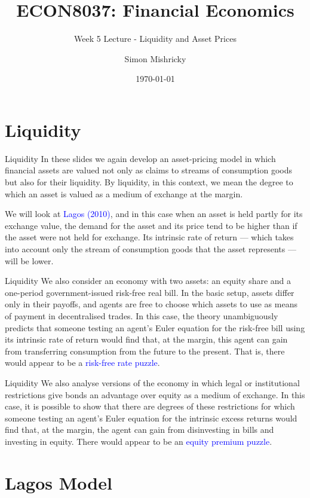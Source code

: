 \documentclass[aspectratio=169,xcolor=dvipsnames]{beamer}
\title{ECON8037: Financial Economics}
\subtitle{\normalsize Week 5 Lecture - Liquidity and Asset Prices}
\author{Simon Mishricky}
\institute{Research School of Economics, Australian National University}
\date{\today}
\begin{document}
\section{Liquidity}
\frame{\titlepage}

\begin{frame}{Liquidity}
    In these slides we again develop an asset-pricing model in which financial assets are valued not only as claims to streams of consumption goods but also for their liquidity. By liquidity, in this context, we mean the degree to which an asset is valued as a medium of exchange at the margin.

    We will look at \textcolor{blue}{Lagos (2010)}, and in this case when an asset is held partly for its exchange value, the demand for the asset and its price tend to be higher than if the asset were not held for exchange. Its intrinsic rate of return --- which takes into account only the stream of consumption goods that the asset represents --- will be lower.
\end{frame}

\begin{frame}{Liquidity}
    We also consider an economy with two assets: an equity share and a one-period government-issued risk-free real bill. In the basic setup, assets differ only in their payoffs, and agents are free to choose which assets to use as means of payment in decentralised trades. In this case, the theory unambiguously predicts that someone testing an agent's Euler equation for the risk-free bill using its intrinsic rate of return would find that, at the margin, this agent can gain from transferring consumption from the future to the present. That is, there would appear to be a \textcolor{blue}{risk-free rate puzzle}.
\end{frame}

\begin{frame}{Liquidity}
    We also analyse versions of the economy in which legal or institutional restrictions give bonds an advantage over equity as a medium of exchange. In this case, it is possible to show that there are degrees of these restrictions for which someone testing an agent's Euler equation for the intrinsic excess returns would find that, at the margin, the agent can gain from disinvesting in bills and investing in equity. There would appear to be an \textcolor{blue}{equity premium puzzle}.
\end{frame}

\section{Lagos Model}
\end{document}

